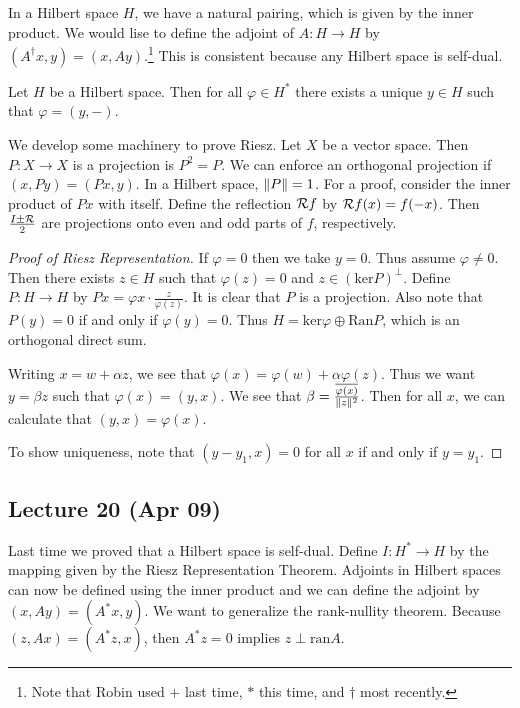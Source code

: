 \documentclass[10pt, twoside]{article}
\begin{document}
    In a Hilbert space $H$, we have a natural pairing, which is given by the inner product. We would lise to define the adjoint of $A:H \to H$ by $(A^{\dag}x,y) = (x,Ay)$.\footnote{Note that Robin used $+$ last time, $*$ this time, and $\dag$ most recently.} This is consistent because any Hilbert space is self-dual.

    \begin{thm}
        Let $H$ be a Hilbert space. Then for all $\varphi \in H^*$ there exists a unique $y \in H$ such that $\varphi = (y,-)$.
    \end{thm}

    We develop some machinery to prove Riesz. Let $X$ be a vector space. Then $P:X \to X$ is a projection is $P^2=P$. We can enforce an orthogonal projection if $(x,Py) = (Px,y)$. In a Hilbert space, $\lVert P\rVert = 1$. For a proof, consider the inner product of $Px$ with itself. Define the reflection $\mathcal{R}f$ by $\mathcal{R}f(x) = f(-x)$. Then $\frac{I\pm\mathcal{R}}{2}$ are projections onto even and odd parts of $f$, respectively.

    \begin{proof}[Proof of Riesz Representation]
        If $\varphi = 0$ then we take $y=0$. Thus assume $\varphi \neq 0$. Then there exists $z \in H$ such that $\varphi(z)=0$ and $z \in (\mathrm{ker}P)^{\perp}$. Define $P:H \to H$ by $Px = \varphi{x} \cdot \frac{z}{\varphi(z)}$. It is clear that $P$ is a projection. Also note that $P(y) = 0$ if and only if $\varphi(y) = 0$. Thus $H = \mathrm{ker} \varphi \oplus \mathrm{Ran} P$, which is an orthogonal direct sum.

        Writing $x=w+\alpha z$, we see that $\varphi(x) = \varphi(w) + \alpha \varphi(z)$. Thus we want $y=\beta z$ such that $\varphi(x) = (y,x)$. We see that $\beta = \frac{\overline{\varphi(x)}}{\lVert z\rVert^2}$. Then for all $x$, we can calculate that $(y,x) = \varphi(x)$.

        To show uniqueness, note that $(y-y_1,x) = 0$ for all $x$ if and only if $y=y_1$.
    \end{proof}

    \subsection{Lecture 20 (Apr 09)}
    Last time we proved that a Hilbert space is self-dual. Define $I: H^* \to H$ by the mapping given by the Riesz Representation Theorem. Adjoints in Hilbert spaces can now be defined using the inner product and we can define the adjoint by $(x,Ay) = (A^*x,y)$. We want to generalize the rank-nullity theorem. Because $(z,Ax) = (A^*z,x)$, then $A^*z = 0$ implies $z \perp \mathrm{ran} A$.
\end{document}
